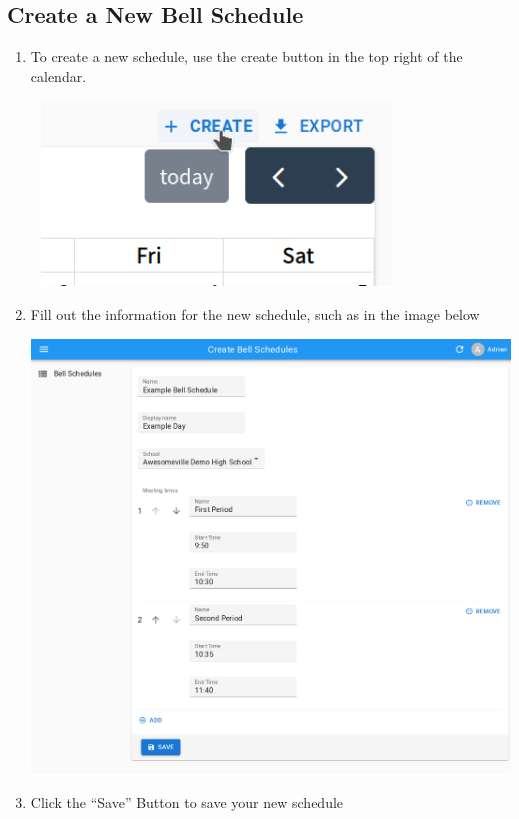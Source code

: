 \documentclass{article}
\begin{document}
\subsection{Create a New Bell Schedule}
\begin{enumerate}
\item {To create a new schedule, use the create button in the top right of the calendar.}
\begin{center}
\includegraphics[width=3.8693in,height=1.9382in]{Mini20Manual-img010.png}
\end{center}
\item {Fill out the information for the new schedule, such as in the image below}
\begin{center}
\includegraphics[width=\textwidth]{Mini20Manual-img011.png}
\end{center}
\item {Click the “Save” Button to save your new schedule}
\end{enumerate}
\end{document}
